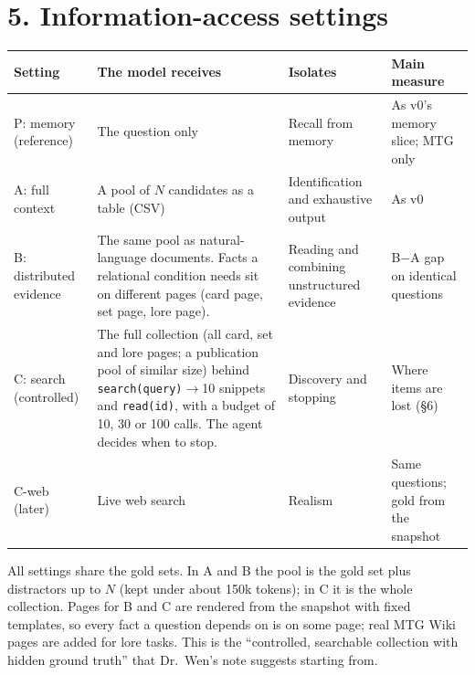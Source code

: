 \documentclass[10pt]{article}
\begin{document}
\section*{5. Information-access settings}
{\small
\begin{tabularx}{\linewidth}{@{}L{2.4cm}YL{3.5cm}L{3.2cm}@{}}
\toprule
Setting & The model receives & Isolates & Main measure \\
\midrule
P: memory (reference) & The question only & Recall from memory & As v0's memory slice; MTG only \\
A: full context & A pool of $N$ candidates as a table (CSV) & Identification and exhaustive output & As v0 \\
B: distributed evidence & The same pool as natural-language documents. Facts a relational condition needs sit on
different pages (card page, set page, lore page). & Reading and combining unstructured evidence & B$-$A gap on
identical questions \\
C: search (controlled) & The full collection (all card, set and lore pages; a publication pool of similar size)
behind \texttt{search(query)}$\to$10 snippets and \texttt{read(id)}, with a budget of 10, 30 or 100 calls. The agent
decides when to stop. & Discovery and stopping & Where items are lost (\S6) \\
C-web (later) & Live web search & Realism & Same questions; gold from the snapshot \\
\bottomrule
\end{tabularx}}

All settings share the gold sets. In A and B the pool is the gold set plus distractors up to $N$ (kept under about
150k tokens); in C it is the whole collection. Pages for B and C are rendered from the snapshot with fixed
templates, so every fact a question depends on is on some page; real MTG Wiki pages are added for lore tasks.
This is the ``controlled, searchable collection with hidden ground truth'' that Dr.\ Wen's note suggests starting from.
\end{document}
